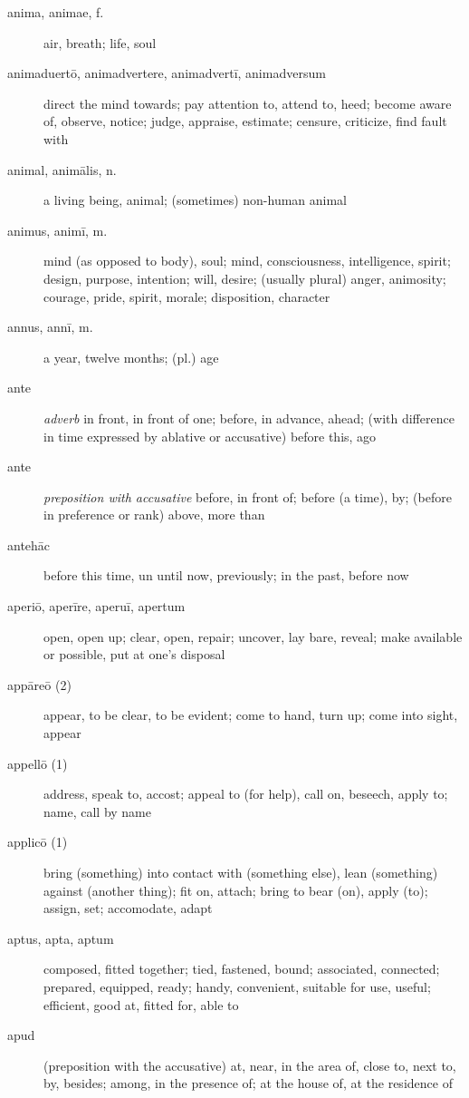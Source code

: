\begin{description}
    \item[anima, animae, f.] \marginnote{*}air, breath; life, soul
    \item[animaduertō, animadvertere, animadvertī, animadversum] \marginnote{*}direct the mind towards; pay attention to, attend to, heed; become aware of, observe, notice; judge, appraise, estimate; censure, criticize, find fault with
    \item[animal, animālis, n.] \marginnote{*}a living being, animal; (sometimes) non-human animal
    \item[animus, animī, m.] \marginnote{*}mind (as opposed to body), soul; mind, consciousness, intelligence, spirit; design, purpose, intention; will, desire; (usually plural) anger, animosity; courage, pride, spirit, morale; disposition, character
    \item[annus, annī, m.] \marginnote{*}a year, twelve months; (pl.) age
    \item[ante] \marginnote{*}\textit{adverb} in front, in front of one; before, in advance, ahead; (with difference in time expressed by ablative or accusative) before this, ago
    \item[ante] \marginnote{*}\textit{preposition with accusative} before, in front of; before (a time), by; (before in preference or rank) above, more than
    \item[antehāc] before this time, un until now, previously; in the past, before now
    \item[aperiō, aperīre, aperuī, apertum] \marginnote{*}open, open up; clear, open, repair; uncover, lay bare, reveal; make available or possible, put at one's disposal
    \item[appāreō (2)] \marginnote{*}appear, to be clear, to be evident; come to hand, turn up; come into sight, appear
    \item[appellō (1)] \marginnote{*} address, speak to, accost; appeal to (for help), call on, beseech, apply to; name, call by name
    \item[applicō (1)] bring (something) into contact with (something else), lean (something) against (another thing); fit on, attach; bring to bear (on), apply (to); assign, set; accomodate, adapt
    \item[aptus, apta, aptum] \marginnote{*}composed, fitted together; tied, fastened, bound; associated, connected; prepared, equipped, ready; handy, convenient, suitable for use, useful; efficient, good at, fitted for, able to
    \item[apud] \marginnote{*}(preposition with the accusative) at, near, in the area of, close to, next to, by, besides; among, in the presence of; at the house of, at the residence of

\end{description}

